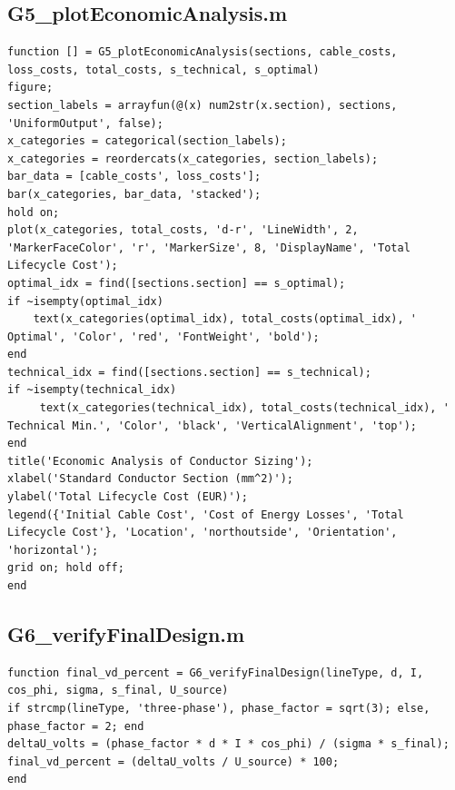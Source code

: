 \documentclass[12pt, a4paper]{article}
\begin{document}
\subsection{G5\_plotEconomicAnalysis.m}
\begin{lstlisting}[caption={Plots the economic analysis results to find the optimal section.}, label={lst:G5}]
function [] = G5_plotEconomicAnalysis(sections, cable_costs, loss_costs, total_costs, s_technical, s_optimal)
figure;
section_labels = arrayfun(@(x) num2str(x.section), sections, 'UniformOutput', false);
x_categories = categorical(section_labels);
x_categories = reordercats(x_categories, section_labels);
bar_data = [cable_costs', loss_costs'];
bar(x_categories, bar_data, 'stacked');
hold on;
plot(x_categories, total_costs, 'd-r', 'LineWidth', 2, 'MarkerFaceColor', 'r', 'MarkerSize', 8, 'DisplayName', 'Total Lifecycle Cost');
optimal_idx = find([sections.section] == s_optimal);
if ~isempty(optimal_idx)
    text(x_categories(optimal_idx), total_costs(optimal_idx), '  Optimal', 'Color', 'red', 'FontWeight', 'bold');
end
technical_idx = find([sections.section] == s_technical);
if ~isempty(technical_idx)
     text(x_categories(technical_idx), total_costs(technical_idx), '  Technical Min.', 'Color', 'black', 'VerticalAlignment', 'top');
end
title('Economic Analysis of Conductor Sizing');
xlabel('Standard Conductor Section (mm^2)');
ylabel('Total Lifecycle Cost (EUR)');
legend({'Initial Cable Cost', 'Cost of Energy Losses', 'Total Lifecycle Cost'}, 'Location', 'northoutside', 'Orientation', 'horizontal');
grid on; hold off;
end
\end{lstlisting}

\subsection{G6\_verifyFinalDesign.m}
\begin{lstlisting}[caption={Performs a final verification of the voltage drop for the chosen design.}, label={lst:G6}]
function final_vd_percent = G6_verifyFinalDesign(lineType, d, I, cos_phi, sigma, s_final, U_source)
if strcmp(lineType, 'three-phase'), phase_factor = sqrt(3); else, phase_factor = 2; end
deltaU_volts = (phase_factor * d * I * cos_phi) / (sigma * s_final);
final_vd_percent = (deltaU_volts / U_source) * 100;
end
\end{lstlisting}
\end{document}
